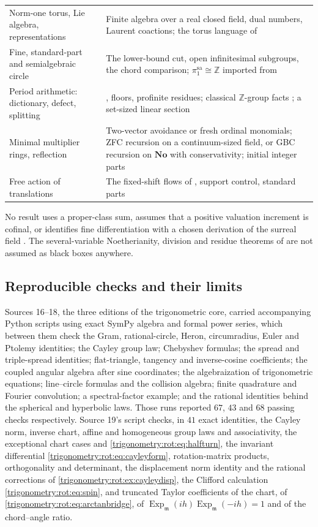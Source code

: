\documentclass[11pt,letterpaper]{article}
\numberwithin{equation}{section}
\theoremstyle{definition}
\theoremstyle{remark}
\newcommand{\No}{\mathbf{No}}
\newcommand{\Z}{\mathbb Z}
\newcommand{\mm}{\mathfrak m}
\newcommand{\Ex}{\operatorname{Exp}_{\mm}}
\begin{document}
\begin{center}
\begin{longtable}{L{0.28\textwidth}L{0.62\textwidth}}
Norm-one torus, Lie algebra, representations & Finite algebra over a real closed field, dual numbers, Laurent coactions; the torus language of \cite{Milne}\\
Fine, standard-part and semialgebraic circle & The lower-bound cut, open infinitesimal subgroups, the chord comparison; $\pi_1^{\mathrm{sa}}\cong\Z$ imported from \cite{DK,BaroOtero}\\
Period arithmetic: dictionary, defect, splitting & , floors, profinite residues; classical $\Z$-group facts \cite{Jerabek}; a set-sized linear section\\
Minimal multiplier rings, reflection & Two-vector avoidance or fresh ordinal monomials; ZFC recursion on a continuum-sized field, or GBC recursion on $\No$ with conservativity; initial integer parts \cite[Lemma 11.1]{EK}\\
Free action of translations & The fixed-shift flows of \cite[Theorem 5.2]{Saut}, support control, standard parts\\
\bottomrule
\end{longtable}
\end{center}
No result uses a proper-class sum, assumes that a positive valuation increment is cofinal, or
identifies fine differentiation with a chosen derivation of the surreal field \cite{BM}. The
several-variable Noetherianity, division and residue theorems of
\cite{SourceGeometry,SourceIntersections} are not assumed as black boxes anywhere.

\subsection{Reproducible checks and their limits}
Sources 16--18, the three editions of the trigonometric core, carried accompanying Python scripts using exact SymPy
algebra and formal power series, which between them check the Gram, rational-circle, Heron,
circumradius, Euler and Ptolemy identities; the Cayley group law; Chebyshev formulas; the spread
and triple-spread identities; flat-triangle, tangency and inverse-cosine coefficients; the coupled
angular algebra after sine coordinates; the algebraization of trigonometric equations; line--circle
formulas and the collision algebra; finite quadrature and Fourier convolution; a spectral-factor
example; and the rational identities behind the spherical and hyperbolic laws. Those runs reported
$67$, $43$ and $68$ passing checks respectively. Source 19's script checks, in $41$ exact identities,
the Cayley norm, inverse chart, affine and homogeneous group laws and associativity, the exceptional
chart cases and \cref{trigonometry:rot:eq:halfturn}, the invariant differential
\cref{trigonometry:rot:eq:cayleyform}, rotation-matrix products, orthogonality and determinant, the
displacement norm identity and the rational corrections of \cref{trigonometry:rot:ex:cayleydisp}, the
Clifford calculation \cref{trigonometry:rot:eq:spin}, and truncated Taylor coefficients of the chart,
of \cref{trigonometry:rot:eq:arctanbridge}, of $\Ex(ih)\Ex(-ih)=1$ and of the chord--angle ratio.
\end{document}
